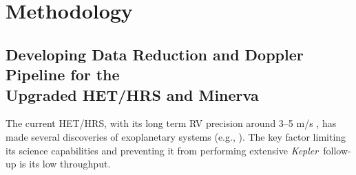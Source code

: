 \documentclass[12pt]{article}
\def\kepler{{\it Kepler}}
\def\hrs{HET/HRS}
\begin{document}
\begin{comment}
The ability of fitting an pure iodine spectrum taken by the
spectrograph can reflect how well the IP is being modeled. The typical
$\chi_\nu^2$ value that we obtain for fitting iodine spectra with a
generic IP model, Gauss-Hermite polynomials, is about 2.5, while for
Keck/HIRES, the $\chi_\nu^2$ value is typically 1.05. The current
successful IP model for Keck/HIRES (sum of Gaussians) in the CPS
pipeline is the product of careful studies and numerous trials with IP
modeling. A better understanding of the IP of HRS will bring visible
improvements to its RV precision, since the IP modeling affects
directly several key procedures in the Doppler pipeline, such as the
creation of stellar spectrum template and the forward-modeling of the
observed stellar$+$iodine spectrum. We are at the beginning of this
endeavour, and we are confident that, with our experience with the
Keck/HIRES IP modeling, we can well characterize the HRS IP to achieve
a significant improvement in its RV precision.

We are also scrutinizing all aspects of the instrument and our
pipeline for places to improve. For example, we have recently
re-scanned the iodine cell used at HRS to assess the effects of cell
temperature change, which appears to be insignificant. The new iodine
scan, however, differs from the old one, and we are currently
investigating the reason behind this and the effects it brings.
\end{comment}



\vspace{-3pt}
\section{Methodology}


\vspace{-3pt}
\subsection{Developing Data Reduction and Doppler Pipeline for the \\
  Upgraded HET/HRS and Minerva}\label{develop} 

The current \hrs, with its long term RV precision around 3--5 m/s
\citep{baluev2009,wang2011}, has made several discoveries of
exoplanetary systems (e.g.,
\citealt{wittenmyer2009,gettel2012,wang2012}). The key factor limiting
its science capabilities and preventing it from performing extensive
\kepler\ follow-up is its low throughput.
\end{document}
